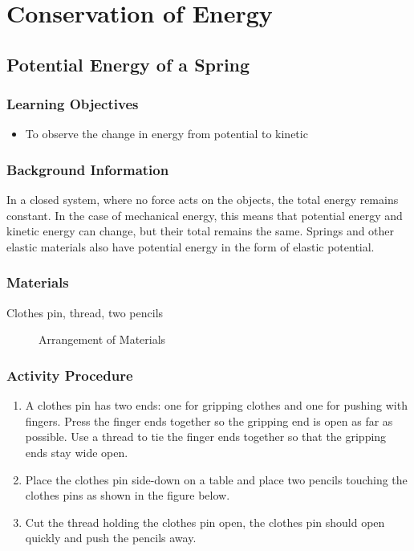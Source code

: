 \section{Conservation of Energy}

\subsection{Potential Energy of a Spring}

\subsubsection*{Learning Objectives}
\begin{itemize}
\item{To observe the change in energy from potential to kinetic}
\end{itemize}

\subsubsection*{Background Information}
In a closed system, where no force acts on the objects, the total energy remains constant.  In the case of mechanical energy, this means that potential energy and kinetic energy can change, but their total remains the same.  Springs and other elastic materials also have potential energy in the form of elastic potential.

\subsubsection{Materials} 
Clothes pin, thread, two pencils

\begin{figure}[h]
\begin{center}
\def\svgwidth{200pt}

\caption{Arrangement of Materials}
\label{fig:energy-conservation}
\end{center}
\end{figure}

\subsubsection{Activity Procedure}
\begin{enumerate}
\item{A clothes pin has two ends: one for gripping clothes and one for pushing with fingers. Press the finger ends together so the gripping end is open as far as possible. Use a thread to tie the finger ends together so that the gripping ends stay wide open.}
\item{Place the clothes pin side-down on a table and place two pencils touching the clothes pins as shown in the figure below.}
\item{Cut the thread holding the clothes pin open, the clothes pin should open quickly and push the pencils away.}
\end{enumerate}

